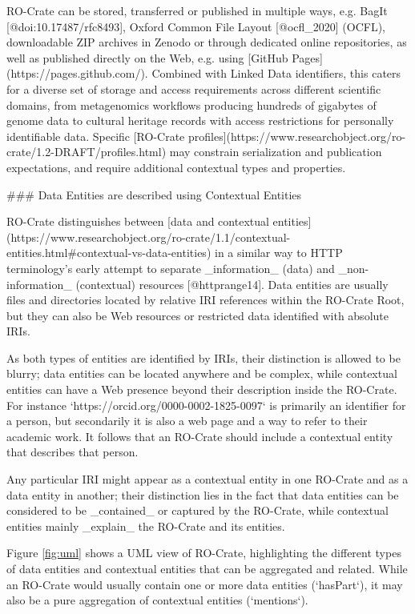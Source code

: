 {RO-Crate can be stored, transferred or published in multiple ways, e.g. BagIt [@doi:10.17487/rfc8493], Oxford Common File Layout [@ocfl_2020] (OCFL), downloadable ZIP archives in Zenodo or through dedicated online repositories, as well as published directly on the Web, e.g. using [GitHub Pages](https://pages.github.com/). Combined with Linked Data identifiers, this caters for a diverse set of storage and access requirements across different scientific domains, from metagenomics workflows producing hundreds of gigabytes of genome data to cultural heritage records with access restrictions for personally identifiable data. Specific [RO-Crate profiles](https://www.researchobject.org/ro-crate/1.2-DRAFT/profiles.html) may constrain serialization and publication expectations, and require additional contextual types and properties.

### Data Entities are described using Contextual Entities

RO-Crate distinguishes between [data and contextual entities](https://www.researchobject.org/ro-crate/1.1/contextual-entities.html#contextual-vs-data-entities) in a similar way to HTTP terminology's early attempt to separate _information_ (data) and _non-information_ (contextual) resources [@httprange14]. Data entities are usually files and directories located by relative IRI references within the RO-Crate Root, but they can also be Web resources or restricted data identified with absolute IRIs.

As both types of entities are identified by IRIs, their distinction is allowed to be blurry; data entities can be located anywhere and be complex, while contextual entities can have a Web presence beyond their description inside the RO-Crate. For instance `https://orcid.org/0000-0002-1825-0097` is primarily an identifier for a person, but secondarily it is also a web page and a way to refer to their academic work. It follows that an RO-Crate should include a contextual entity that describes that person. 

Any particular IRI might appear as a contextual entity in one RO-Crate and as a data entity in another; their distinction lies in the fact that data entities can be considered to be _contained_ or captured by the RO-Crate, while contextual entities mainly _explain_ the RO-Crate and its entities. 

Figure \ref{fig:uml} shows a UML view of RO-Crate, highlighting the different types of data entities and contextual entities that can be aggregated and related. While an RO-Crate would usually contain one or more data entities (`hasPart`), it may also be a pure aggregation of contextual entities (`mentions`).

}
